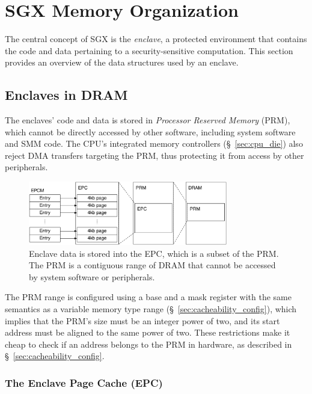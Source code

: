 \section{SGX Memory Organization}
\label{sec:memory}

The central concept of SGX is the \textit{enclave}, a protected environment
that contains the code and data pertaining to a security-sensitive computation.
This section provides an overview of the data structures used by an enclave.


\subsection{Enclaves in DRAM}
\label{sec:prm}


The enclaves' code and data is stored in \textit{Processor Reserved Memory}
(PRM), which cannot be directly accessed by other software, including system
software and SMM code. The CPU's integrated memory controllers
(\S~\ref{sec:cpu_die}) also reject DMA transfers targeting the PRM, thus
protecting it from access by other peripherals.

\begin{figure}[hbt]
  \centering
  \includegraphics[width=87mm]{figures/sgx_epc.pdf}
  \caption{
    Enclave data is stored into the EPC, which is a subset of the PRM. The
    PRM is a contiguous range of DRAM that cannot be accessed by system
    software or peripherals.
  }
  \label{fig:sgx_epc}
\end{figure}

The PRM range is configured using a base and a mask register with the same
semantics as a variable memory type range (\S~\ref{sec:cacheability_config}),
which implies that the PRM's size must be an integer power of two, and its
start address must be aligned to the same power of two. These restrictions make
it cheap to check if an address belongs to the PRM in hardware, as described in
\S~\ref{sec:cacheability_config}.


\subsubsection{The Enclave Page Cache (EPC)}
\label{sec:epc}

